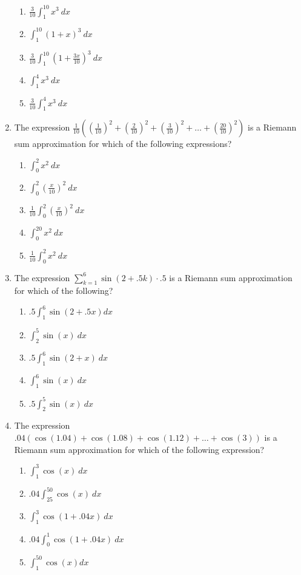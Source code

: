 \documentclass[12pt]{report}
\begin{document}
\begin{enumerate}
\begin{enumerate}
\item $\frac{3}{10}\int_1^{10}x^3\ dx$
\item $\int_1^{10}(1+x)^3\ dx$
\item $\frac{3}{10}\int_1^{10}\left(1+\frac{3x}{10}\right)^3\ dx$
\item $\int_1^4x^3\ dx$
\item $\frac{3}{10}\int_1^4x^3\ dx$
\end{enumerate}

\item The expression $\frac{1}{10}\left(\left(\frac{1}{10}\right)^2+\left(\frac{2}{10}\right)^2+\left(\frac{3}{10}\right)^2+\ldots +\left(\frac{20}{10}\right)^2\right)$ is a Riemann sum approximation for which of the following expressions?
\begin{enumerate}

\item $\int_0^2x^2\ dx$
\item $\int_0^2\left(\frac{x}{10}\right)^2\ dx$
\item $\frac{1}{10}\int_0^2\left(\frac{x}{10}\right)^2\ dx$
\item $\int_0^{20}x^2\ dx$
\item $\frac{1}{10}\int_0^2x^2\ dx$
\end{enumerate}


\item The expression $\sum_{k=1}^{6}\sin(2+.5k)\cdot.5$  is a Riemann sum approximation for which of the following?

\begin{enumerate}
\item $.5\int_1^{6}\sin(2+.5x) dx$
\item $\int_2^{5}\sin(x)\ dx$
\item $.5\int_1^{6}\sin(2+x)\ dx$
\item $\int_1^6\sin(x)\ dx$
\item $.5\int_2^5\sin(x)\ dx$
\end{enumerate}

\pagebreak

\item The expression $.04\left(\cos(1.04)+\cos(1.08)+\cos(1.12)+\ldots +\cos(3)\right)$ is a Riemann sum approximation for which of the following expression?

\begin{enumerate}

\item $\int_1^3\cos(x)\ dx$

\item $.04\int_{25}^{50}\cos(x)\ dx$

\item $\int_1^3\cos(1+.04x)\ dx$

\item $.04\int_0^1\cos(1+.04x)\ dx$

\item $\int_{1}^{50}\cos(x) dx$

\end{enumerate}

\end{enumerate}
\end{document}
